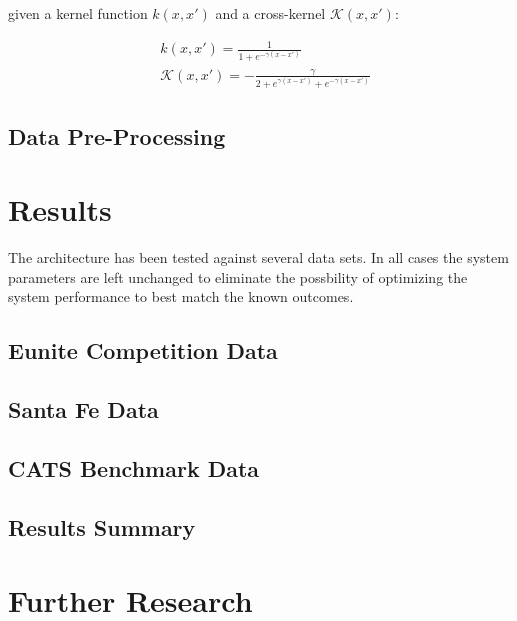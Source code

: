 \documentclass[10pt]{article}
\begin{document}
given a kernel function \( k(x,x') \) and a cross-kernel \( \mathcal{K}(x,x') \):

\begin{align}
&k(x,x') = \frac{1}{1+e^{-\gamma(x-x')} } \\
&\mathcal{K}(x,x') = -\frac{\gamma}{2 + e^{\gamma(x-x')} + e^{-\gamma(x-x')} } 
\end{align}


\subsection{Data Pre-Processing}




\section{Results}
The architecture has been tested against several data sets.  In all cases the system parameters are left unchanged to eliminate the possbility of optimizing the system performance to best match the known outcomes.

\subsection{Eunite Competition Data}


\subsection{Santa Fe Data}


\subsection{CATS Benchmark Data}


\subsection{Results Summary}


\section{Further Research}
\end{document}
